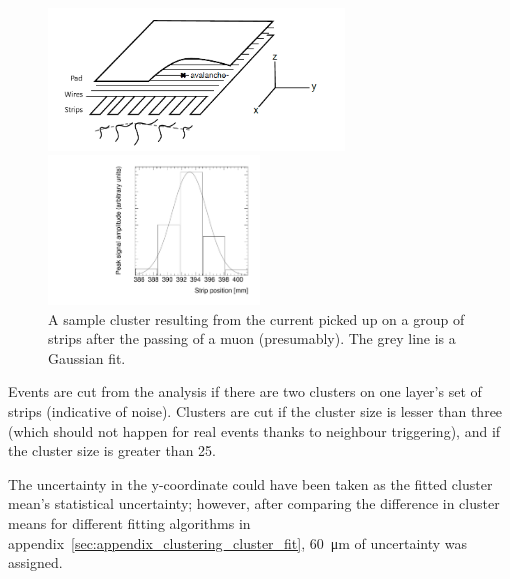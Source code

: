 \begin{figure}
    \centering
    \includegraphics[width = 0.7\textwidth]{figures/mwpc_lefebvre_thesis_gatti.png}
    \caption{A sketch of an sTGC-like detector. The position of the avalanche could be extracted from the wires and strips that picked up the avalanche signal. The signals on individual strips are sketched. Clustering was the processs of fitting a Gaussian to the peak value of the signals on individual contiguous strips, as is done in figure~\ref{fig:sample_cluster}. In this work, the $x$($y$)-coordinate will always refer to the coordinate perpendicular to the wires (strips)~\cite{lefebvre_thesis, gatti_optimum_1979}.}
    \label{fig:mwpc_coords}
    \vspace*{\floatsep}
    \centering
    \includegraphics[width = 0.5\textwidth]{figures/sample_cluster_QL2C04_event5_layer2.pdf}
    \caption{A sample cluster resulting from the current picked up on a group of strips  after the passing of a muon (presumably). The grey line is a Gaussian fit.}
    \label{fig:sample_cluster}
\end{figure}

Events are cut from the analysis if there are two clusters on one layer's set of strips (indicative of noise). Clusters are cut if the cluster size is lesser than three (which should not happen for real events thanks to neighbour triggering), and if the cluster size is greater than 25.

The uncertainty in the y-coordinate could have been taken as the fitted cluster mean's statistical uncertainty; however, after comparing the difference in cluster means for different fitting algorithms in appendix~\ref{sec:appendix_clustering_cluster_fit}, \SI{60}{\micro\meter} of uncertainty was assigned.

